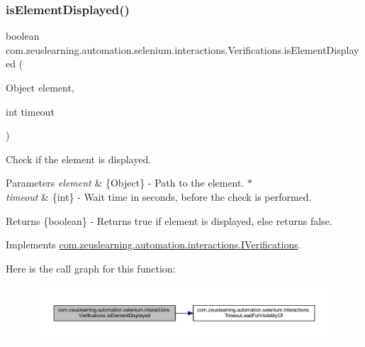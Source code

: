 \subsubsection{\texorpdfstring{is\+Element\+Displayed()}{isElementDisplayed()}\hspace{0.1cm}{\footnotesize\ttfamily [2/2]}}
{\footnotesize\ttfamily boolean com.\+zeuslearning.\+automation.\+selenium.\+interactions.\+Verifications.\+is\+Element\+Displayed (\begin{DoxyParamCaption}\item[{Object}]{element,  }\item[{int}]{timeout }\end{DoxyParamCaption})\hspace{0.3cm}{\ttfamily [inline]}}

Check if the element is displayed.


\begin{DoxyParams}{Parameters}
{\em element} & \{Object\} -\/ Path to the element. $\ast$ \\
\hline
{\em timeout} & \{int\} -\/ Wait time in seconds, before the check is performed. \\
\hline
\end{DoxyParams}
\begin{DoxyReturn}{Returns}
\{boolean\} -\/ Returns {\ttfamily true} if element is displayed, else returns {\ttfamily false}. 
\end{DoxyReturn}


Implements \hyperlink{interfacecom_1_1zeuslearning_1_1automation_1_1interactions_1_1IVerifications_a047cd4a4c2d0096b993b0e45c885e79d}{com.\+zeuslearning.\+automation.\+interactions.\+I\+Verifications}.

Here is the call graph for this function\+:
\nopagebreak
\begin{figure}[H]
\begin{center}
\leavevmode
\includegraphics[width=350pt]{d2/d6b/classcom_1_1zeuslearning_1_1automation_1_1selenium_1_1interactions_1_1Verifications_a264caf7f6bbeaec8a7a416024ec4617b_cgraph}
\end{center}
\end{figure}
\hypertarget{classcom_1_1zeuslearning_1_1automation_1_1selenium_1_1interactions_1_1Verifications_ab6c1a1245269d660bdcd26eff9ac35ad}{}\label{classcom_1_1zeuslearning_1_1automation_1_1selenium_1_1interactions_1_1Verifications_ab6c1a1245269d660bdcd26eff9ac35ad} 
